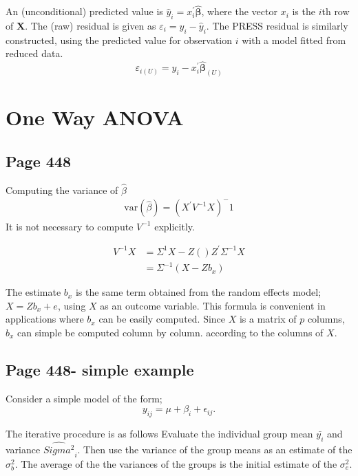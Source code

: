 \documentclass[12pt, a4paper]{report}
\theoremstyle{plain}
\theoremstyle{definition}
\theoremstyle{remark}
\begin{document}

	An (unconditional) predicted value is $\hat{y}_i = x^{\prime}_i \boldsymbol{\hat{\beta}}$, where
	the vector $x_i$ is the $i$th row of $\boldsymbol{X}$.
	The (raw) residual is given as $\varepsilon_i = y_i - \hat{y}_i$. The PRESS residual is
	similarly constructed, using the predicted value for observation $i$ with a model fitted from reduced data.
	\[ \varepsilon_{i(U)} = y_i - x^{\prime}_i \boldsymbol{\hat{\beta}}_{(U)} \]
	
	
\section{One Way ANOVA}
	\subsection{Page 448}
	Computing the variance of $\hat{\beta}$
	\begin{eqnarray}
	\mbox{var}(\hat{\beta}) = (X^{\prime}V^{-1}X)^-1
	\end{eqnarray}
	It is not necessary to compute $V^{-1}$ explicitly.
	
	\begin{eqnarray}
	V^{-1}X &= \Sigma^{1}{X-Z()Z^{\prime}\Sigma^{-1}X} \\
	&= \Sigma^{-1}(X-Zb_{x})
	\end{eqnarray}
	
	The estimate $b_{x}$ is the same term obtained from the random effects model; $X = Zb_{x} + e$, using $X$ as an outcome variable.
	This formula is convenient in applications where $b_{x}$ can be easily computed. Since $X$ is a matrix of $p$ columns, $b_{x}$ can simple be computed column by column. according to the columns of $X$.
	\subsection{Page 448- simple example}
	Consider a simple model of the form;
	\begin{equation*}
	y_{ij} = \mu + \beta_{i} + \epsilon_{ij}.
	\end{equation*}
	
	The iterative procedure is as follows Evaluate the individual group mean $\bar{y_{i}}$ and variance $\hat{Sigma^2}_{i}$. Then use the variance of the group means as an estimate of the $\sigma^2_{b}$. The average of the the variances of the groups is the initial estimate of the $\sigma^2_{e}$.
\end{document}
